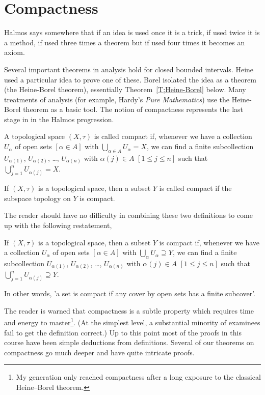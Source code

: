 \section{Compactness} Halmos says somewhere that if
an idea is used once it is a trick, if used twice it
is a method, if used three times a theorem but if used
four times it becomes an axiom.

Several important theorems in analysis
hold for closed bounded intervals. Heine
used a particular idea to prove one of
these. Borel isolated the idea as a theorem
(the Heine-Borel theorem), essentially
Theorem~\ref{T;Heine-Borel} below.
Many treatments of analysis (for example,
Hardy's \emph{Pure Mathematics}) use the
Heine-Borel theorem as a basic tool.
The notion of compactness represents the last stage in
in the Halmos progression.

\begin{definition}\label{D;compact}
A topological space $(X,\tau)$
is called compact if, whenever we have a collection
$U_{\alpha}$ of open sets $[\alpha\in A]$
with $\bigcup_{\alpha\in A}U_{\alpha}=X$, we can find a
finite subcollection $U_{\alpha(1)}$,
$U_{\alpha(2)}$, \dots, $U_{\alpha(n)}$
with $\alpha(j)\in A$ $[1\leq j\leq n]$
such that $\bigcup_{j=1}^{n}U_{\alpha(j)}=X$.
\end{definition}
\begin{definition} If $(X,\tau)$ is a topological space,
then a subset $Y$ is called compact if the subspace topology
on $Y$ is compact.
\end{definition}
The reader should have no difficulty in combining
these two definitions to come up with the
following restatement,
\begin{lemma}\label{L;compact equivalence} If $(X,\tau)$
is a topological space,
then a subset $Y$ is compact if, whenever we have a collection
$U_{\alpha}$ of open sets $[\alpha\in A]$
with $\bigcup_{\alpha}U_{\alpha}\supseteq Y$, we can find a
finite subcollection $U_{\alpha(1)}$,
$U_{\alpha(2)}$, \dots, $U_{\alpha(n)}$
with $\alpha(j)\in A$ $[1\leq j\leq n]$
such that $\bigcup_{j=1}^{n}U_{\alpha(j)}\supseteq Y$.
\end{lemma}
In other words, 'a set is compact if any cover by
open sets has a finite subcover'.

The reader is warned that compactness is a subtle
property which requires time and energy
to master\footnote{My generation only reached compactness
after a long exposure to the classical Heine--Borel
theorem.}.
(At the simplest level, a substantial minority
of examinees fail to get the definition correct.)
Up to this point most of the proofs in this course
have been simple deductions from
definitions. Several of our theorems
on compactness go much deeper and have quite intricate proofs.

